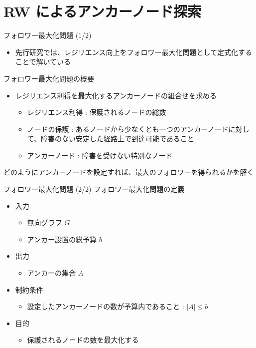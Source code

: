 \documentclass[compress,dvipdfmx,11pt]{beamer}
\begin{document}
\section{RW によるアンカーノード探索}
\label{sec:org0282284}
\begin{frame}[label={sec:orgd25499c}]{フォロワー最大化問題 (1/2)}
\begin{itemize}
\item 先行研究では、レジリエンス向上をフォロワー最大化問題として定式化することで解いている
\end{itemize}

フォロワー最大化問題の概要
\begin{itemize}
\item レジリエンス利得を最大化するアンカーノードの組合せを求める
\begin{itemize}
\item レジリエンス利得 : 保護されるノードの総数
\item ノードの保護 : あるノードから少なくとも一つのアンカーノードに対し
て、障害のない安定した経路上で到達可能であること
\item アンカーノード : 障害を受けない特別なノード
\end{itemize}
\end{itemize}

どのようにアンカーノードを設定すれば、最大のフォロワーを得られるかを解く
\end{frame}
\begin{frame}[label={sec:orged383bc}]{フォロワー最大化問題 (2/2)}
フォロワー最大化問題の定義
\begin{itemize}
\item 入力
\begin{itemize}
\item 無向グラフ \(G\)
\item アンカー設置の総予算 \(b\)
\end{itemize}

\item 出力
\begin{itemize}
\item アンカーの集合 \(A\)
\end{itemize}

\item 制約条件
\begin{itemize}
\item 設定したアンカーノードの数が予算内であること : \(|A| \leq b\)
\end{itemize}

\item 目的
\begin{itemize}
\item 保護されるノードの数を最大化する
\end{itemize}
\end{itemize}
\end{frame}
\end{document}
